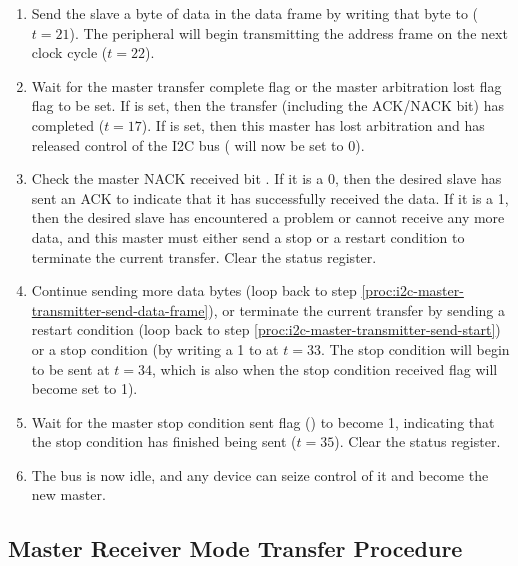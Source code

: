 \begin{enumerate}
	\item \label{proc:i2c-master-transmitter-send-data-frame} Send the slave a byte of data in the data frame by writing that byte to  ($t = 21$). The  peripheral will begin transmitting the address frame on the next clock cycle ($t = 22$).
	\item Wait for the master transfer complete flag  or the master arbitration lost flag  flag to be set. If  is set, then the transfer (including the ACK/NACK bit) has completed ($t = 17$). If  is set, then this master has lost arbitration and has released control of the I2C bus ( will now be set to 0).
	\item Check the master NACK received bit . If it is a 0, then the desired slave has sent an ACK to indicate that it has successfully received the data. If it is a 1, then the desired slave has encountered a problem or cannot receive any more data, and this master must either send a stop or a restart condition to terminate the current transfer. Clear the status register.
	\item Continue sending more data bytes (loop back to step \ref{proc:i2c-master-transmitter-send-data-frame}), or terminate the current transfer by sending a restart condition (loop back to step \ref{proc:i2c-master-transmitter-send-start}) or a stop condition (by writing a 1 to  at $t = 33$. The stop condition will begin to be sent at $t = 34$, which is also when the stop condition received flag  will become set to 1).
	\item Wait for the master stop condition sent flag () to become 1, indicating that the stop condition has finished being sent ($t = 35$). Clear the status register.
	\item The bus is now idle, and any device can seize control of it and become the new master.
\end{enumerate}



\subsection{Master Receiver Mode Transfer Procedure}

